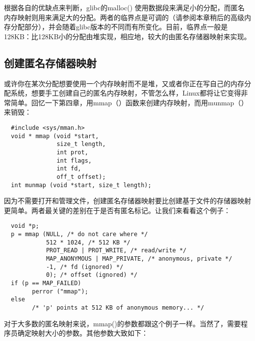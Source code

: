 根据各自的优缺点来判断，glibc的malloc() 使用数据段来满足小的分配，而匿名内存映射则用来满足大的分配。两者的临界点是可调的（请参阅本章稍后的高级内存分配部分），并会随着glibc版本的不同而有所变化。目前，临界点一般是128KB：比128KB小的分配由堆实现，相应地，较大的由匿名存储器映射来实现。 

\subsection{创建匿名存储器映射}

或许你在某次分配想要使用一个内存映射而不是堆，又或者你正在写自己的内存分配系统，想要手工创建自己的匿名内存映射，不管怎么样，Linux都将让它变得非常简单。回忆一下第四章，用mmap（）函数来创建内存映射，而用munmap（）来销毁： 

\begin{lstlisting}
  #include <sys/mman.h>
  void * mmap (void *start,
               size_t length,
               int prot,
               int flags,
               int fd,
               off_t offset);
  int munmap (void *start, size_t length);
\end{lstlisting}

因为不需要打开和管理文件，创建匿名存储器映射要比创建基于文件的存储器映射更简单。两者最关键的差别在于是否有匿名标记。让我们来看看这个例子： 

\begin{lstlisting}
  void *p;
  p = mmap (NULL, /* do not care where */
            512 * 1024, /* 512 KB */
            PROT_READ | PROT_WRITE, /* read/write */
            MAP_ANONYMOUS | MAP_PRIVATE, /* anonymous, private */
            -1, /* fd (ignored) */
            0); /* offset (ignored) */
  if (p == MAP_FAILED)
        perror ("mmap");
  else
        /* 'p' points at 512 KB of anonymous memory... */
\end{lstlisting}

对于大多数的匿名映射来说，mmap()的参数都跟这个例子一样。当然了，需要程序员确定映射大小的参数。其他参数大致如下： 

